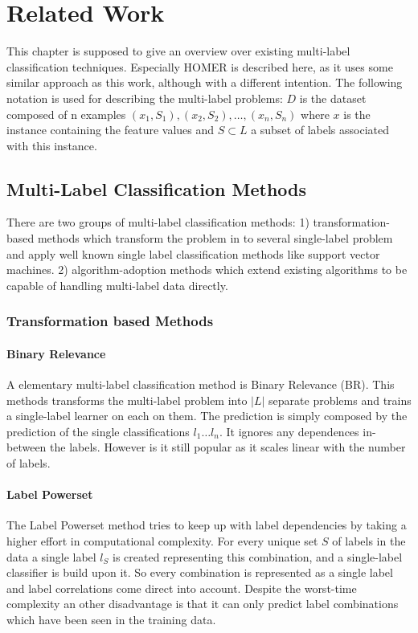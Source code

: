 \chapter{Related Work}
\label{chapter:RelatedWork}

This chapter is supposed to give an overview over existing multi-label classification techniques. Especially HOMER is described here, as it uses some similar approach as this work, although with a different intention. The following notation is used for describing the multi-label problems: $ D $ is the dataset composed of n examples $ (x_1,S_1),(x_2,S_2),\hdots,(x_n,S_n) $ where $ x $ is the instance containing the feature values and $ S \subset L $ a subset of labels associated with this instance.

\section{Multi-Label Classification Methods}
There are two groups of multi-label classification methods\cite{Tsoumakas07}: 1) transformation-based methods which transform the problem in to several single-label problem and apply well known single label classification methods like support vector machines. 2) algorithm-adoption methods which extend existing algorithms to be capable of handling multi-label data directly.
\subsection{Transformation based Methods}
\subsubsection{Binary Relevance}
A elementary multi-label classification method is Binary Relevance (BR). This methods transforms the multi-label problem into $ |L| $ separate problems and trains a single-label learner on each on them. The prediction is simply composed by the prediction of the single classifications $ l_1\hdots l_n $. It ignores any dependences in-between the labels. However is it still popular as it scales linear with the number of labels.
\subsubsection{Label Powerset}
The Label Powerset method tries to keep up with label dependencies by taking a higher effort in computational complexity. For every unique set $ S $ of labels in the data a single label $ l_S $ is created representing this combination, and a single-label classifier is build upon it. So every combination is represented as a single label and label correlations come direct into account. Despite the worst-time complexity an other disadvantage is that it can only predict label combinations which have been seen in the training data.
